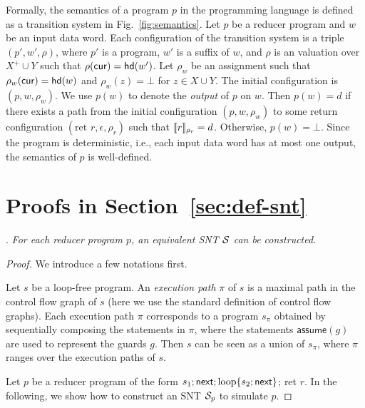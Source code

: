 \begin{appendix}
Formally, the semantics of a program $p$ in the programming language is defined as a transition system in Fig.~\ref{fig:semantics}. Let $p$ be a reducer program and $w$ be an input data word.  Each configuration of the transition system is a triple $(p', w', \rho)$, where $p'$ is a program, $w'$ is a suffix of $w$, and $\rho$ is an valuation over $X^+\cup Y$ such that $\rho(\mathsf{cur})=\mathsf{hd}(w')$. 
Let $\rho_w$ be an assignment such that $\rho_w(\mathsf{cur})=\mathsf{hd}(w)$ and $\rho_w(z)=\bot$ for $z \in X \cup Y$.
The initial configuration is $(p, w, \rho_w)$.
We use $p(w)$ to denote the \emph{output} of $p$ on $w$. Then $p(w) =d$ if there exists a path from the initial configuration $(p, w, \rho_w)$ to some return configuration $(\mbox{ret }r,  \epsilon, \rho_r)$ such that $
\llbracket r\rrbracket_{\rho_r}=d$. Otherwise, $p(w)=\bot$. Since the program is deterministic, i.e., each input data word has at most one output, the semantics of $p$ is well-defined.

\section{Proofs in Section~\ref{sec:def-snt}}




\newcommand\assume{\mathsf{assume}}

\newcommand\loc{\mathfrak{l}}

.
{\it 
For each reducer program $p$, an equivalent SNT ${\mathcal{S} }$ can be constructed.
}

\smallskip

\begin{proof}
We introduce a few notations first.

Let $s$ be a loop-free program. An \emph{execution path} $\pi$ of $s$ is a maximal path in the control flow graph of $s$ (here we use the standard definition of control flow graphs). Each execution path $\pi$ corresponds to a program $s_\pi$ obtained by sequentially composing the statements in $\pi$, where the statements $\assume(g)$ are used to represent the guards $g$. Then $s$ can be seen as a union of $s_\pi$, where $\pi$ ranges over the execution paths of $s$. 

Let $p$ be a reducer program of the form $s_1; \mathsf{next}; \mbox{loop\{} s_2;\mathsf{next}\mbox{\}}$; ret $r$.  In the following, we show how to construct an SNT ${\mathcal{S} }_p$ to simulate $p$.


\end{proof}
\end{appendix}
